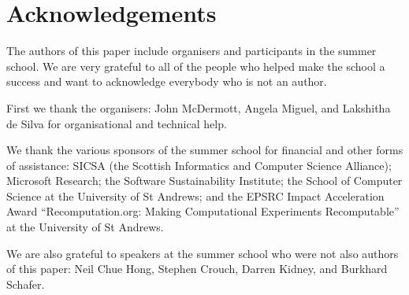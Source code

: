 \section*{Acknowledgements}
\label{s:ack}

The authors of this paper include organisers and participants in the
summer school. We are very grateful to all of the people who helped
make the school a success and want to acknowledge everybody who is not an
author.

First we thank the organisers: John McDermott, Angela Miguel, and Lakshitha de Silva for organisational and technical help.

We thank the various sponsors of the summer school for financial and
other forms of assistance:
SICSA (the Scottish Informatics and Computer Science Alliance); 
Microsoft Research; the Software Sustainability Institute; 
the School of Computer Science at the University of St Andrews; 
and the EPSRC Impact Acceleration Award ``Recomputation.org: Making
Computational Experiments Recomputable''
at the University of St Andrews.

We are also grateful to speakers at the summer school who were not also authors of this paper: 
Neil Chue Hong,
Stephen Crouch, 
Darren Kidney, and
Burkhard Schafer.
